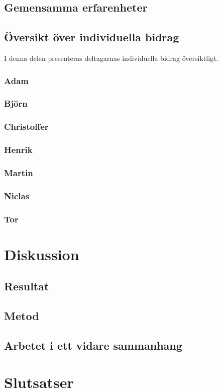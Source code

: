 \documentclass[a4paper,10pt]{article}
\begin{document}
\subsection{Gemensamma erfarenheter}

\subsection{Översikt över individuella bidrag}
I denna delen presenteras deltagarnas individuella bidrag översiktligt.

\subsubsection{Adam}
\subsubsection{Björn}
\subsubsection{Christoffer}
\subsubsection{Henrik}
\subsubsection{Martin}
\subsubsection{Niclas}
\subsubsection{Tor}


\section{Diskussion}

\subsection{Resultat}

\subsection{Metod}

\subsection{Arbetet i ett vidare sammanhang}

\section{Slutsatser}
\end{document}
